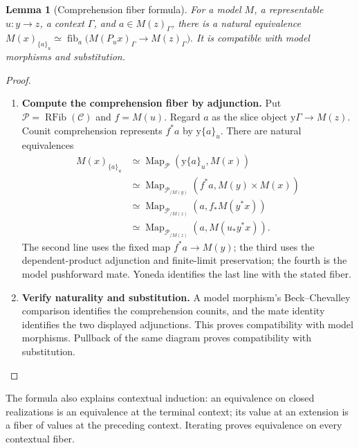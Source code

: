 \documentclass[oneside]{article}
\theoremstyle{plain}
\newtheorem{lemma}[theorem]{Lemma}
\theoremstyle{definition}
\theoremstyle{remark}
\newcommand{\Map}{\operatorname{Map}}
\newcommand{\RFib}[1]{\operatorname{RFib}(#1)}
\newcommand{\fib}{\operatorname{fib}}
\newcommand{\yo}{\mathrm y}
\begin{document}
\begin{lemma}[Comprehension fiber formula]
\label{lem:comprehension-fiber}
    For a model $M$, a representable $u:y\to z$, a context $\Gamma$, and $a\in M(z)_\Gamma$, there is a natural equivalence $M(x)_{\{a\}_u}\simeq \fib_a\bigl(M(P_ux)_\Gamma\to M(z)_\Gamma\bigr).$ It is compatible with model morphisms and substitution.
\end{lemma}
\begin{proof}
    \leavevmode
    \begin{enumerate}
        \item \textbf{Compute the comprehension fiber by adjunction.} Put $\mathcal P=\RFib{\mathcal C}$ and $f=M(u)$. Regard $a$ as the slice object $\yo\Gamma\to M(z)$. Counit comprehension represents $f^*a$ by $\yo\{a\}_u$. There are natural equivalences
        \begin{align*}
             M(x)_{\{a\}_u}
             &\simeq\Map_{\mathcal P}(\yo\{a\}_u,M(x))\\
             &\simeq\Map_{\mathcal P_{/M(y)}}(f^*a,M(y)\times M(x))\\
             &\simeq\Map_{\mathcal P_{/M(z)}}(a,f_*M(y^*x))\\
             &\simeq\Map_{\mathcal P_{/M(z)}}(a,M(u_*y^*x)).
        \end{align*}
        The second line uses the fixed map $f^*a\to M(y)$; the third uses the dependent-product adjunction and finite-limit preservation; the fourth is the model pushforward mate. Yoneda identifies the last line with the stated fiber.
    
        \item \textbf{Verify naturality and substitution.} A model morphism's Beck--Chevalley comparison identifies the comprehension counits, and the mate identity identifies the two displayed adjunctions. This proves compatibility with model morphisms. Pullback of the same diagram proves compatibility with substitution.\qedhere
    \end{enumerate}
\end{proof}

The formula also explains contextual induction: an equivalence on closed realizations is an equivalence at the terminal context; its value at an extension is a fiber of values at the preceding context. Iterating proves equivalence on every contextual fiber.
\end{document}
